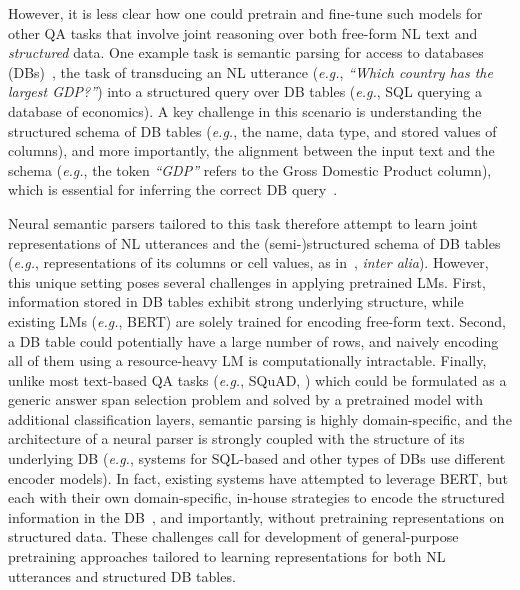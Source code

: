 \documentclass[11pt,a4paper]{article}
\renewcommand{\tt}[1]{\fontfamily{cmtt}\selectfont #1}
\newcommand{\eg}{\hbox{\emph{e.g.}}\xspace}
\begin{document}
However, it is less clear how one could pretrain and fine-tune such models for other QA tasks that involve joint reasoning over both free-form NL text and \emph{structured} data.
One example task is semantic parsing for access to databases (DBs)~\citep{DBLP:conf/aaai/ZelleM96,berant2013freebase,DBLP:conf/acl/YihCHG15}, the task of transducing an NL utterance (\eg, \textit{``Which country has the largest GDP?''}) into a structured query over DB tables (\eg, SQL querying a database of economics).
A key challenge in this scenario is understanding the structured schema of DB tables (\eg, the name, data type, and stored values of columns), and more importantly, the alignment between the input text and the schema (\eg, the token \textit{``GDP''} refers to the {\tt Gross Domestic Product} column), which is essential for inferring the correct DB query~\citep{DBLP:dblp_conf/acl/BerantL14}.


Neural semantic parsers tailored to this task therefore attempt to learn joint representations of NL utterances and the (semi-)structured schema of DB tables (\eg, representations of its columns or cell values, as in~\citet{krishnamurthy17constraint,Bogin2019RepresentingSS,Wang2019RATSQLRS}, \textit{inter alia}).
However, this unique setting poses several challenges in applying pretrained LMs.
First, information stored in DB tables exhibit strong underlying structure, while existing LMs (\eg, BERT) are solely trained for encoding free-form text.
Second, a DB table could potentially have a large number of rows, and naively encoding all of them using a resource-heavy LM is computationally intractable.
Finally, unlike most text-based QA tasks (\eg, SQuAD, ) which could be formulated as a generic answer span selection problem and solved by a pretrained model with additional classification layers,
semantic parsing is highly domain-specific, and the architecture of a neural parser is strongly coupled with the structure of its underlying DB 
(\eg, systems for SQL-based and other types of DBs use different encoder models). 
In fact, existing systems have attempted to leverage BERT, but each with their own domain-specific, in-house strategies to encode the structured information in the DB~\citep{Guo2019TowardsCT,Zhang2019EditingBasedSQ,Hwang2019ACE},
and importantly, without pretraining representations on structured data.
These challenges call for development of general-purpose pretraining approaches tailored to learning representations for both NL utterances and structured DB tables. 
\end{document}
